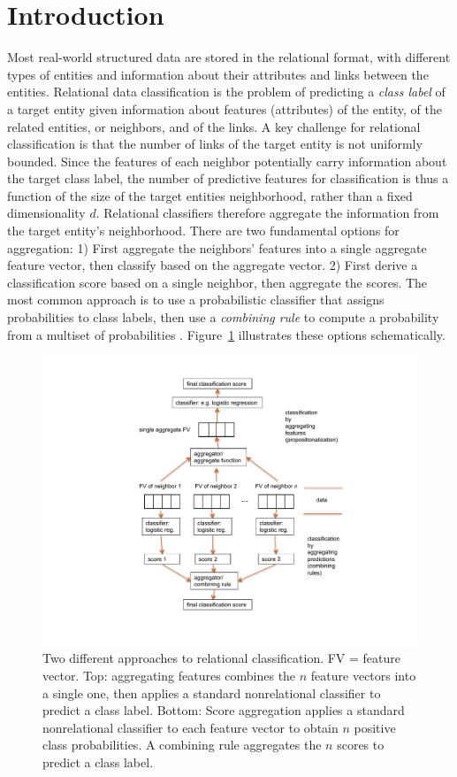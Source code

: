 \documentclass[conference]{IEEEtran}
\begin{document}
\section{Introduction}
Most real-world structured data are stored in the relational format, with different types of entities and information about their attributes and links between the entities.
Relational data classification is the problem of predicting a {\em class label} of a target entity given information about features (attributes) of the entity, of the related entities, or neighbors, and of the links.
A key challenge for relational classification is that the number of links of the target entity is not uniformly bounded. Since the features of each neighbor potentially carry information about the target class label, the number of predictive features for classification is thus a function of the size of the target entities neighborhood, rather than a fixed dimensionality $d$. Relational classifiers therefore aggregate the information from the target entity's neighborhood. There are two fundamental options for aggregation: 1) First aggregate the neighbors' features into a single aggregate feature vector, then classify based on the aggregate vector. 2) First derive a classification score based on a single neighbor, then aggregate the scores. The most common approach is to use a probabilistic classifier that assigns probabilities to class labels, then use a {\em combining rule} to compute a probability from a multiset of probabilities \cite{Pearl1988,Kersting2007}.
%
Figure~\ref{fig:classify} illustrates these options schematically.
\begin{figure}[htbp]
\begin{center}
\includegraphics[width = 0.5 \textwidth]{classify}
\caption{Two different approaches to relational classification. FV = feature vector. Top: aggregating features combines the $n$ feature vectors into a single one, then applies a standard nonrelational classifier to predict a class label. Bottom: Score aggregation applies a standard nonrelational classifier to each feature vector to obtain $n$ positive class probabilities. A combining rule aggregates the $n$ scores to predict a class label.}
\label{fig:classify}
\end{center}
\end{figure}
\end{document}
